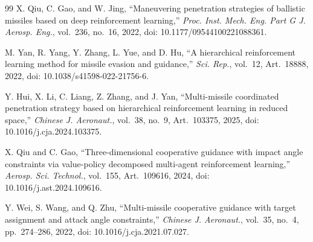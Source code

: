 \begin{thebibliography}{99}
X. Qiu, C. Gao, and W. Jing, ``Maneuvering penetration strategies of ballistic missiles based on deep reinforcement learning,'' \textit{Proc. Inst. Mech. Eng. Part G J. Aerosp. Eng.}, vol.~236, no.~16, 2022, doi: 10.1177/09544100221088361.

M. Yan, R. Yang, Y. Zhang, L. Yue, and D. Hu, ``A hierarchical reinforcement learning method for missile evasion and guidance,'' \textit{Sci. Rep.}, vol.~12, Art.~18888, 2022, doi: 10.1038/s41598-022-21756-6.

Y. Hui, X. Li, C. Liang, Z. Zhang, and J. Yan, ``Multi-missile coordinated penetration strategy based on hierarchical reinforcement learning in reduced space,'' \textit{Chinese J. Aeronaut.}, vol.~38, no.~9, Art.~103375, 2025, doi: 10.1016/j.cja.2024.103375.

X. Qiu and C. Gao, ``Three-dimensional cooperative guidance with impact angle constraints via value-policy decomposed multi-agent reinforcement learning,'' \textit{Aerosp. Sci. Technol.}, vol.~155, Art.~109616, 2024, doi: 10.1016/j.ast.2024.109616.

Y. Wei, S. Wang, and Q. Zhu, ``Multi-missile cooperative guidance with target assignment and attack angle constraints,'' \textit{Chinese J. Aeronaut.}, vol.~35, no.~4, pp.~274--286, 2022, doi: 10.1016/j.cja.2021.07.027.

\end{thebibliography}
